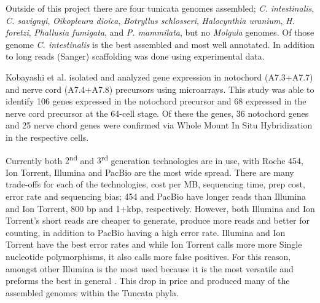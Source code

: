 Outside of this project there are four tunicata genomes assembled; \textit{C. intestinalis}, \textit{C. savignyi}, \textit{Oikopleura dioica}, \textit{Botryllus schlosseri}, \textit{Halocynthia uranium}, \textit{H. foretzi}, \textit{Phallusia fumigata}, and \textit{P. mammilata}, but no \textit{Molgula} genomes. Of those genome \textit{C. intestinalis} is the best assembled and most well annotated. In addition to long reads (Sanger) scaffolding was done using experimental data\cite{satou_improved_2008}.

Kobayashi et al. \cite{kobayashi_differential_2013} isolated and analyzed gene expression in notochord (A7.3+A7.7) and nerve cord (A7.4+A7.8) precursors using microarrays. This study was able to identify 106 genes expressed in the notochord precursor and 68 expressed in the nerve cord precursor at the 64-cell stage. Of these the genes, 36 notochord genes and 25 nerve chord genes were confirmed via Whole Mount In Situ Hybridization in the respective cells. 

Currently both $2$\textsuperscript{nd} and $3$\textsuperscript{rd} generation technologies are in use, with Roche 454, Ion Torrent, Illumina and PacBio are the most wide spread. There are many trade-offs for each of the technologies, cost per MB, sequencing time, prep cost, error rate and sequencing bias; 454 and PacBio have longer reads than Illumina and Ion Torrent, 800 bp and 1+kbp, respectively. However, both Illumina and Ion Torrent's short reads are cheaper to generate, produce more reads and better for counting, in addition to PacBio having a high error rate. Illumina and Ion Torrent have the best error rates and while Ion Torrent calls more more Single nucleotide polymorphisms, it also calls more false positives.  For this reason, amongst other Illumina is the most used because it is the most versatile and preforms the best in general \cite{glenn_field_2011,quail_tale_2012}. This drop in price and produced many of the assembled genomes within the Tuncata phyla. 

